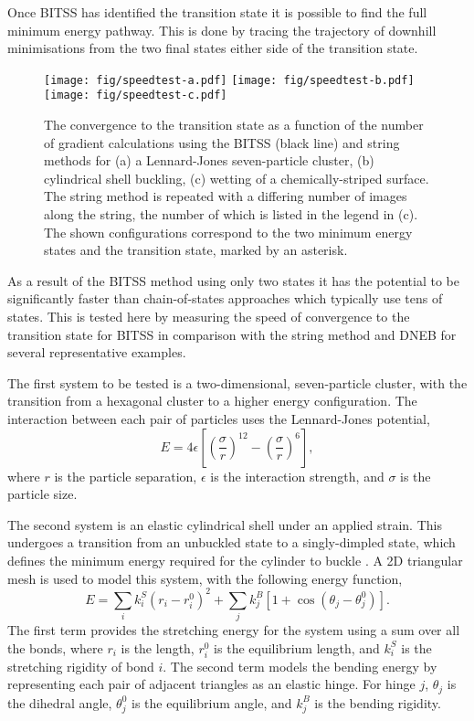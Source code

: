 \documentclass[aps,prl,twocolumn,groupedaddress]{revtex4}
\begin{document}
\topic Once BITSS has identified the transition state it is possible to find the full minimum energy pathway.
This is done by tracing the trajectory of downhill minimisations from the two final states either side of the transition state.


\begin{figure*}[tb]
  \texttt{[image: fig/speedtest-a.pdf]}%
  \texttt{[image: fig/speedtest-b.pdf]}%
  \texttt{[image: fig/speedtest-c.pdf]}%
  \caption{\label{fig:speedtest}
    The convergence to the transition state as a function of the number of gradient calculations using the BITSS (black line) and string methods for (a) a Lennard-Jones seven-particle cluster, (b) cylindrical shell buckling, (c) wetting of a chemically-striped surface.
    The string method is repeated with a differing number of images along the string, the number of which is listed in the legend in (c).
    The shown configurations correspond to the two minimum energy states and the transition state, marked by an asterisk.
  }
\end{figure*}
\topic As a result of the BITSS method using only two states it has the potential to be significantly faster than chain-of-states approaches which typically use tens of states.
This is tested here by measuring the speed of convergence to the transition state for BITSS in comparison with the string method and DNEB for several representative examples.

\topic The first system to be tested is a two-dimensional, seven-particle cluster, with the transition from a hexagonal cluster to a higher energy configuration.
The interaction between each pair of particles uses the Lennard-Jones potential,
\begin{equation}
  E = 4\epsilon \left[ \left(\frac{\sigma}{r}\right)^{12} - \left(\frac{\sigma}{r}\right)^6 \right],
\end{equation}
where $r$ is the particle separation, $\epsilon$ is the interaction strength, and $\sigma$ is the particle size.

\topic The second system is an elastic cylindrical shell under an applied strain.
This undergoes a transition from an unbuckled state to a singly-dimpled state, which defines the minimum energy required for the cylinder to buckle \cite{Panter2019}.
A 2D triangular mesh is used to model this system, with the following energy function,
\begin{equation}
  E = \sum_i k^S_i (r_i - r^0_i)^2 + \sum_j k^B_j [1 + \cos(\theta_j - \theta^0_j)].
\end{equation}
The first term provides the stretching energy for the system using a sum over all the bonds, where $r_i$ is the length, $r^0_i$ is the equilibrium length, and $k^S_i$ is the stretching rigidity of bond $i$.
The second term models the bending energy by representing each pair of adjacent triangles as an elastic hinge.
For hinge $j$, $\theta_j$ is the dihedral angle, $\theta^0_j$ is the equilibrium angle, and $k^B_j$ is the bending rigidity.
\end{document}
